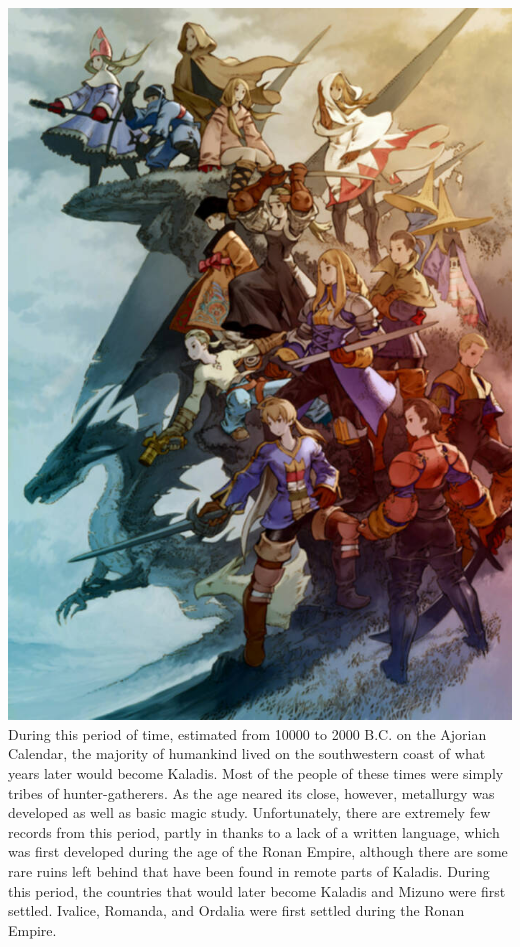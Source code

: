 \includegraphics[width=\columnwidth]{./art/images/everyone.jpg}
%
\clearpage
%
%
%
\\
During this period of time, estimated from 10000 to 2000 B.C. on the Ajorian Calendar, the majority of humankind lived on the southwestern coast of what years later would become Kaladis. 
Most of the people of these times were simply tribes of hunter-gatherers. 
As the age neared its close, however, metallurgy was developed as well as basic magic study. 
Unfortunately, there are extremely few records from this period, partly in thanks to a lack of a written language, which was first developed during the age of the Ronan Empire, although there are some rare ruins left behind that have been found in remote parts of Kaladis.
During this period, the countries that would later become Kaladis and Mizuno were first settled. Ivalice, Romanda, and Ordalia were first settled during the Ronan Empire.
